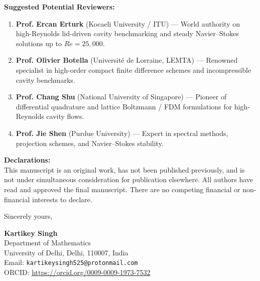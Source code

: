 \documentclass[11pt]{article}
\begin{document}
\vspace{0.8em}
\noindent\textbf{Suggested Potential Reviewers:}
\begin{enumerate}
    \item \textbf{Prof. Ercan Erturk} (Kocaeli University / ITU) --- World authority on high-Reynolds lid-driven cavity benchmarking and steady Navier--Stokes solutions up to $Re = 25,000$.
    \item \textbf{Prof. Olivier Botella} (Universit\'e de Lorraine, LEMTA) --- Renowned specialist in high-order compact finite difference schemes and incompressible cavity benchmarks.
    \item \textbf{Prof. Chang Shu} (National University of Singapore) --- Pioneer of differential quadrature and lattice Boltzmann / FDM formulations for high-Reynolds cavity flows.
    \item \textbf{Prof. Jie Shen} (Purdue University) --- Expert in spectral methods, projection schemes, and Navier--Stokes stability.
\end{enumerate}

\vspace{0.8em}
\noindent\textbf{Declarations:} \\
This manuscript is an original work, has not been published previously, and is not under simultaneous consideration for publication elsewhere. All authors have read and approved the final manuscript. There are no competing financial or non-financial interests to declare.

\vspace{1.2em}
\noindent Sincerely yours,

\vspace{1.5em}
\noindent\textbf{Kartikey Singh} \\
Department of Mathematics \\
University of Delhi, Delhi, 110007, India \\
Email: \texttt{kartikeysingh525@protonmail.com} \\
ORCID: \url{https://orcid.org/0009-0009-1973-7532}
\end{document}
